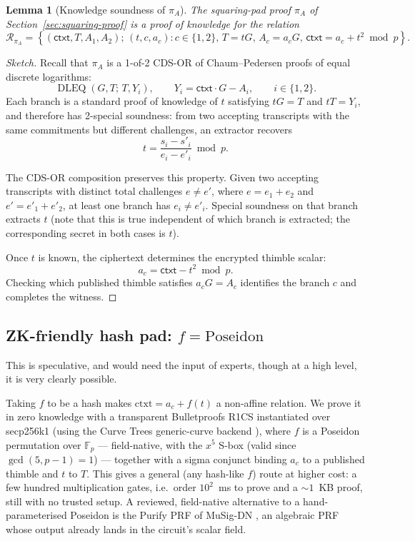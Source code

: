 \documentclass[11pt]{article}
\newtheorem{lemma}{Lemma}
\begin{document}
\begin{lemma}[Knowledge soundness of $\pi_A$]
  The squaring-pad proof $\pi_A$ of Section~\ref{sec:squaring-proof} is a
  proof of knowledge for the relation
  $$
    \mathcal R_{\pi_A}
    =
    \left\{
      (\mathsf{ctxt},T,A_1,A_2);\,
      (t,c,a_c):
      c\in\{1,2\},\,
      T=tG,\,
      A_c=a_cG,\,
      \mathsf{ctxt}=a_c+t^2 \bmod p
    \right\}.
  $$
\end{lemma}

\begin{proof}[Sketch]
  Recall that $\pi_A$ is a 1-of-2 CDS-OR of Chaum--Pedersen proofs of
  equal discrete logarithms:
  $$
    \operatorname{DLEQ}(G,T;\,T,Y_i),
    \qquad
    Y_i = \mathsf{ctxt}\cdot G - A_i,
    \qquad i\in\{1,2\}.
  $$
  Each branch is a standard proof of knowledge of $t$ satisfying
  $tG=T$ and $tT=Y_i$, and therefore has 2-special soundness: from two
  accepting transcripts with the same commitments but different
  challenges, an extractor recovers
  $$
    t = \frac{s_i - s'_i}{e_i - e'_i} \bmod p.
  $$

  The CDS-OR composition preserves this property. Given two accepting
  transcripts with distinct total challenges $e\neq e'$, where
  $e=e_1+e_2$ and $e'=e'_1+e'_2$, at least one branch has
  $e_i\neq e'_i$. Special soundness on that branch extracts $t$ (note that this is true independent of which branch is extracted; the corresponding secret in both cases is $t$).

  Once $t$ is known, the ciphertext determines the encrypted thimble
  scalar:
  $$
    a_c = \mathsf{ctxt} - t^2 \bmod p.
  $$
  Checking which published thimble satisfies $a_c G = A_c$ identifies
  the branch $c$ and completes the witness.
\end{proof}

\subsection{ZK-friendly hash pad: $f=\mathrm{Poseidon}$}

This is speculative, and would need the input of experts, though at a high level, it is very clearly possible.

Taking $f$ to be a hash makes $\textrm{ctxt}=a_c+f(t)$ a non-affine relation. We prove it in zero knowledge with a transparent Bulletproofs \cite{bulletproofs} R1CS instantiated over secp256k1 (using the Curve Trees generic-curve backend \cite{curvetrees}), where $f$ is a Poseidon \cite{poseidon} permutation over $\mathbb{F}_p$ --- field-native, with the $x^5$ S-box (valid since $\gcd(5,p-1)=1$) --- together with a sigma conjunct binding $a_c$ to a published thimble and $t$ to $T$. This gives a general (any hash-like $f$) route at higher cost: a few hundred multiplication gates, i.e.\ order $10^2$~ms to prove and a $\sim\!1$~KB proof, still with no trusted setup. A reviewed, field-native alternative to a hand-parameterised Poseidon is the Purify PRF of MuSig-DN \cite{musigdn}, an algebraic PRF whose output already lands in the circuit's scalar field.
\end{document}
